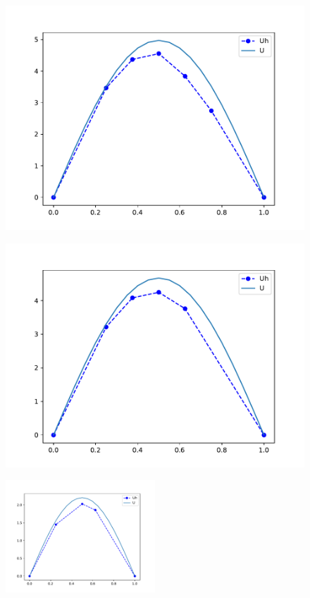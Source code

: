 \documentclass{uonmathreport}
\theoremstyle{definition}
\theoremstyle{problem}
\theoremstyle{theorem}
\begin{document}
\begin{figure}[h!]
\begin{minipage}{0.49\hsize}
   \includegraphics[width=1.1\textwidth]{adap1_time_3.pdf}
  \end{minipage}
  \hfill
    \begin{minipage}{0.49\hsize}
    \vspace{5mm}
    \includegraphics[width=1.1\textwidth]{adap1_time_4.pdf}
  \label{fig:c}
\end{minipage}
    \end{figure}

\begin{figure}[h!]
   \includegraphics[width=0.5\textwidth]{adap1_time_16.pdf}
   
 \label{fig:IndicatorPDE1}
\end{figure}
\end{document}
